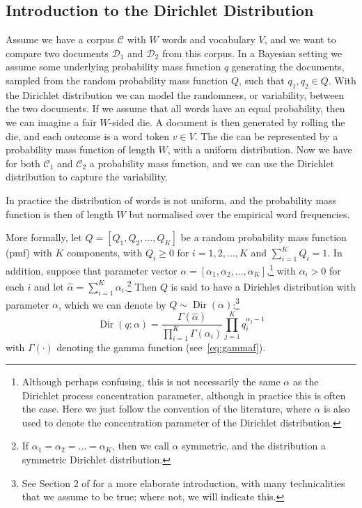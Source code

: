 \subsection{Introduction to the Dirichlet Distribution}

Assume we have a corpus $\mathcal{C}$ with $W$ words and vocabulary $V$, and we want to compare two documents $\mathcal{D}_1$ and $\mathcal{D}_2$ from this corpus. In a Bayesian setting we assume some underlying probability mass function $q$ generating the documents, sampled from the random probability mass function $Q$, such that $q_1,q_2\in Q$. With the Dirichlet distribution we can model the randomness, or variability, between the two documents. If we assume that all words have an equal probability, then we can imagine a fair $W$-sided die. A document is then generated by rolling the die, and each outcome is a word token $v\in V$. The die can be represented by a probability mass function of length $W$, with a uniform distribution. Now we have for both $\mathcal{C}_1$ and $\mathcal{C}_2$ a probability mass function, and we can use the Dirichlet distribution to capture the variability.

In practice the distribution of words is not uniform, and the probability mass function is then of length $W$ but normalised over the empirical word frequencies. 

More formally, let $Q = [Q_1, Q_2, \ldots, Q_K]$ be a random probability mass function (pmf) with $K$ components, with $Q_i \geq 0$ for $i = 1,2,\ldots,K$ and $\sum_{i=1}^K Q_i = 1$. In addition, suppose that parameter vector $\alpha = [\alpha_1,\alpha_2,\ldots,\alpha_K]$,\footnote{Although perhaps confusing, this is not necessarily the same $\alpha$ as the Dirichlet process concentration parameter, although in practice this is often the case. Here we just follow the convention of the literature, where $\alpha$ is also used to denote the concentration parameter of the Dirichlet distribution.} with $\alpha_i > 0$ for each $i$ and let $\hat{\alpha} = \sum_{i=1}^K \alpha_i$.\footnote{If $\alpha_1=\alpha_2=\ldots=\alpha_K$, then we call $\alpha$ symmetric, and the distribution a symmetric Dirichlet distribution.} Then $Q$ is said to have a Dirichlet distribution with parameter $\alpha$, which we can denote by $Q \sim \operatorname{Dir}(\alpha)$:\footnote{See Section 2 of \citet{Ferguson1973A} for a more elaborate introduction, with many technicalities that we assume to be true; where not, we will indicate this.\cite{Ferguson1973A}}%
%
%
\begin{equation}
	\operatorname{Dir}(q; \alpha) = \frac{\Gamma(\hat{\alpha})}{\prod_{i=1}^K \Gamma(\alpha_i)} \prod_{j=1}^K q_i^{\alpha_j-1}
\end{equation}
with $\Gamma(\cdot)$ denoting the gamma function (see~\cref{eq:gammaf}).

